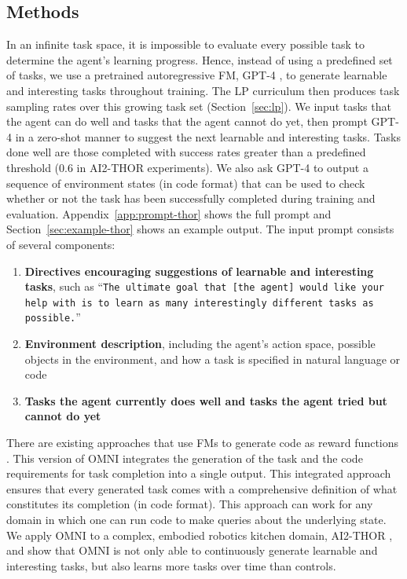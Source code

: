 \documentclass{article} %
\begin{document}
\subsection{Methods}
\label{sec:thor-method}
In an infinite task space, it is impossible to evaluate every possible task to determine the agent's learning progress. Hence, instead of using a predefined set of tasks, we use a pretrained autoregressive FM, GPT-4 \citep{openai2023gpt4}, to generate learnable and interesting tasks throughout training. The LP curriculum then produces task sampling rates over this growing task set (Section~\ref{sec:lp}). We input tasks that the agent can do well and tasks that the agent cannot do yet, then prompt GPT-4 in a zero-shot manner to suggest the next learnable and interesting tasks. Tasks done well are those completed with success rates greater than a predefined threshold (0.6 in AI2-THOR experiments). We also ask GPT-4 to output a sequence of environment states (in code format) that can be used to check whether or not the task has been successfully completed during training and evaluation. Appendix~\ref{app:prompt-thor} shows the full prompt and Section~\ref{sec:example-thor} shows an example output. The input prompt consists of several components:
\begin{enumerate}
    \itemsep1pt
    \item \textbf{Directives encouraging suggestions of learnable and interesting tasks}, such as ``\texttt{The ultimate goal that [the agent] would like your help with is to learn as many interestingly different tasks as possible.}''
    \item \textbf{Environment description}, including the agent's action space, possible objects in the environment, and how a task is specified in natural language or code
    \item \textbf{Tasks the agent currently does well and tasks the agent tried but cannot do yet}
\end{enumerate}

There are existing approaches that use FMs to generate code as reward functions \citep{kwon2023reward, wang2023voyager, yu2023language}. This version of OMNI integrates the generation of the task and the code requirements for task completion into a single output. This integrated approach ensures that every generated task comes with a comprehensive definition of what constitutes its completion (in code format). This approach can work for any domain in which one can run code to make queries about the underlying state. We apply OMNI to a complex, embodied robotics kitchen domain, AI2-THOR \citep{kolve2017ai2}, and show that OMNI is not only able to continuously generate learnable and interesting tasks, but also learns more tasks over time than controls.
\end{document}
